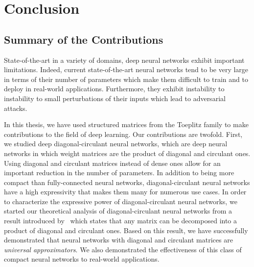 \chapter{Conclusion}
\label{chapter:ch6-conclusion}
\localtoc

\section{Summary of the Contributions}
\label{section:ch6-summary_of_the_contributions}



State-of-the-art in a variety of domains, deep neural networks exhibit important limitations.
Indeed, current state-of-the-art neural networks tend to be very large in terms of their number of parameters which make them difficult to train and to deploy in real-world applications.
Furthermore, they exhibit instability to instability to small perturbations of their inputs which lead to adversarial attacks. 

In this thesis, we have used structured matrices from the Toeplitz family to make contributions to the field of deep learning.
Our contributions are twofold.
First, we studied deep diagonal-circulant neural networks, which are deep neural networks in which weight matrices are the product of diagonal and circulant ones.
Using diagonal and circulant matrices instead of dense ones allow for an important reduction in the number of parameters.
In addition to being more compact than fully-connected neural networks, diagonal-circulant neural networks have a high expressivity that makes them many for numerous use cases.
In order to characterize the expressive power of diagonal-circulant neural networks, we started our theoretical analysis of diagonal-circulant neural networks from a result introduced by~\citet{huhtanen2015factoring} which states that any matrix can be decomposed into a product of diagonal and circulant ones.
Based on this result, we have successfully demonstrated that neural networks with diagonal and circulant matrices are \emph{universal approximators}. 
We also demonstrated the effectiveness of this class of compact neural networks to real-world applications.

